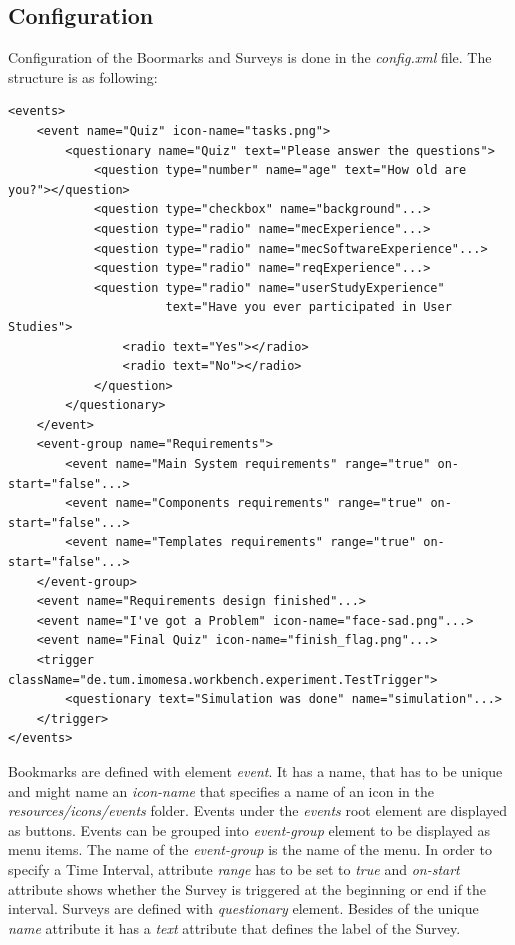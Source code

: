 \subsection{Configuration}\label{subsec:configuration}
Configuration of the Boormarks and Surveys is done in the \textit{config.xml} file. The structure is as following:

\lstset{
  language=XML,
  showstringspaces=false,
}
\begin{lstlisting}
<events>
    <event name="Quiz" icon-name="tasks.png">
        <questionary name="Quiz" text="Please answer the questions">
            <question type="number" name="age" text="How old are you?"></question>
            <question type="checkbox" name="background"...>
            <question type="radio" name="mecExperience"...>          
            <question type="radio" name="mecSoftwareExperience"...>
            <question type="radio" name="reqExperience"...>
            <question type="radio" name="userStudyExperience"
                      text="Have you ever participated in User Studies">
                <radio text="Yes"></radio>
                <radio text="No"></radio>
            </question>
        </questionary>
    </event>
    <event-group name="Requirements">
        <event name="Main System requirements" range="true" on-start="false"...>
        <event name="Components requirements" range="true" on-start="false"...>
        <event name="Templates requirements" range="true" on-start="false"...>
    </event-group>
    <event name="Requirements design finished"...>
    <event name="I've got a Problem" icon-name="face-sad.png"...>
    <event name="Final Quiz" icon-name="finish_flag.png"...>
    <trigger className="de.tum.imomesa.workbench.experiment.TestTrigger">
        <questionary text="Simulation was done" name="simulation"...>
    </trigger>
</events>

\end{lstlisting}

Bookmarks are defined with element \textit{event}. It has a name, that has to be unique and might name an \textit{icon-name} that specifies a name of an icon in the \textit{resources/icons/events} folder. Events under the \textit{events} root element are displayed as buttons. Events can be grouped into \textit{event-group} element to be displayed as menu items. The name of the \textit{event-group} is the name of the menu.   In order to specify a Time Interval, attribute \textit{range} has to be set to \textit{true} and \textit{on-start} attribute shows whether the Survey is triggered at the beginning or end if the interval. Surveys are defined with \textit{questionary} element. Besides of the unique \textit{name} attribute it has a \textit{text} attribute that defines the label of the Survey.\\

